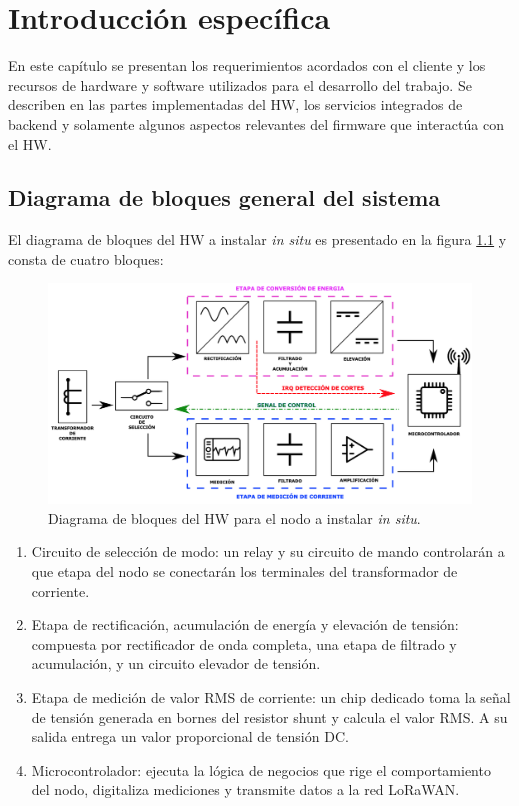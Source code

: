 \chapter{Introducción específica} %
\label{Chapter2}
En este capítulo se presentan los requerimientos acordados con el cliente y los recursos de hardware y software utilizados para el desarrollo del trabajo. Se describen en las partes implementadas del HW, los servicios integrados de backend y solamente algunos aspectos relevantes del firmware que interactúa con el HW.\\
\section{Diagrama de bloques general del sistema}
El diagrama de bloques del HW a instalar \textit{in situ} es presentado en la figura \ref{fig:diagramadebloquesdelhw} y consta de cuatro bloques:
\begin{figure}[h!]
	\centering
	\includegraphics[width=1.0\linewidth]{Figures/diagrama_de_bloques_del_HW}
	\caption{Diagrama de bloques del HW para el nodo a instalar \textit{in situ}.}
	\label{fig:diagramadebloquesdelhw}
\end{figure}
\begin{enumerate}
	\item Circuito de selección de modo: un relay y su circuito de mando controlarán a que etapa del nodo se conectarán los terminales del transformador de corriente.
	\item Etapa de rectificación, acumulación de energía y elevación de tensión: compuesta por rectificador de onda completa, una etapa de filtrado y acumulación, y un circuito elevador de tensión.
	\item Etapa de medición de valor RMS de corriente: un chip dedicado toma la señal de tensión generada en bornes del resistor shunt y calcula el valor RMS. A su salida entrega un valor proporcional de tensión DC.
	\item Microcontrolador: ejecuta la lógica de negocios que rige el comportamiento del nodo, digitaliza mediciones y transmite datos a la red LoRaWAN.
\end{enumerate}

